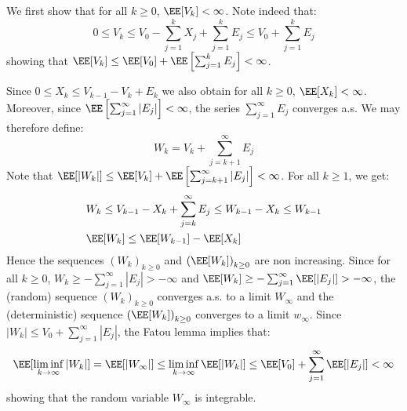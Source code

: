 \documentclass[11pt]{article}
\makeatletter
\renewenvironment{proof}[1][\proofname]{%
   \par\pushQED{\qed}\normalfont%
   \topsep6\p@\@plus6\p@\relax
   \trivlist\item[\hskip\labelsep\bfseries#1]%
   \ignorespaces
}{%
   \popQED\endtrivlist\@endpefalse
}
\theoremstyle{t}
\makeatother
\begin{document}
\begin{proof}
  We first show that for all $k \geq 0$, $\EE[V_k] < \infty$. Note indeed that:
\begin{equation}
0 \leq V_k \leq V_0 - \sum_{j=1}^{k}{X_j} + \sum_{j=1}^{k}{E_j}\leq V_0 + \sum_{j=1}^{k}{E_j}
\end{equation}
showing that $\EE[V_k] \leq \EE[V_0] + \EE\left[\sum_{j=1}^{k}{E_j}\right] < \infty$.

Since $0 \leq X_k \leq V_{k-1} - V_k + E_k$ we also obtain for all $k \geq 0$, $\EE[X_k] < \infty$. Moreover, since $\EE\left[\sum_{j=1}^{\infty}{|E_j|}\right] < \infty$, the series $\sum_{j=1}^{\infty}{E_j}$ converges a.s. We may therefore define:
\begin{equation}
W_k = V_k + \sum_{j=k+1}^{\infty}{E_j}
\end{equation}
Note that $\EE[|W_k|] \leq \EE[V_k]+\EE\left[\sum_{j=k+1}^{\infty}{|E_j|}\right] < \infty $. For all $k \geq 1$, we get:
\begin{equation}\label{chik}
\begin{split}
& W_{k} \leq V_{k-1} - X_{k} + \sum_{j=k}^{\infty}{E_j} \leq W_{k-1} - X_{k}\leq W_{k-1}\\
&\EE[W_k] \leq \EE[W_{k-1}] - \EE[X_{k}]
\end{split}
\end{equation}
Hence the sequences $(W_k)_{k\geq0}$ and $\left(\EE[W_k] \right)_{k\geq0}$ are non increasing. Since for all $k \geq 0$, $W_k \geq -  \sum_{j=1}^{\infty}{|E_j|} > -\infty$ and $\EE[W_k] \geq -  \sum_{j=1}^{\infty}{\EE[|E_j|]} > -\infty$, the (random) sequence $(W_k)_{k\geq0}$ converges a.s. to a limit $W_{\infty}$ and the (deterministic) sequence $\left(\EE[W_k] \right)_{k\geq0}$ converges to a limit $w_{\infty}$. Since $|W_k| \leq V_0 +  \sum_{j=1}^{\infty}{|E_j|}$, the Fatou lemma implies that:
\begin{equation}
\EE[\liminf \limits_{k \to \infty} |W_k|] = \EE[|W_{\infty}|] \leq \liminf \limits_{k \to \infty} \EE[|W_{k}|] \leq \EE[V_{0}] + \sum_{j=1}^{\infty}{\EE[|E_j|]}< \infty
\end{equation}
showing that the random variable $W_{\infty}$  is integrable.


\end{proof}
\end{document}
